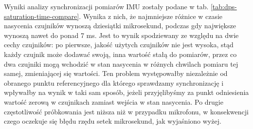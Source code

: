\documentclass[12pt,oneside,a4paper]{book}
\theoremstyle{break}
\begin{document}
\begin{table}[ht]
    \centering
        \caption{Zestawienie czasów wejścia czujników DPS w stan nasycenia}
        \label{tab:dps-saturation-time-compare}
\end{table}
 
Wyniki analizy synchronizacji pomiarów IMU zostały podane w tab. 
\ref*{tab:dps-saturation-time-compare}. Wynika z nich, że 
najmniejsze różnice w czasie nasycenia czujników wynoszą dziesiątki
mikrosekund, podczas gdy największe wynoszą nawet do ponad 7 ms.
Jest to wynik spodziewany ze względu na dwie cechy czujników:
po pierwsze, jakość użytych czujników nie jest wysoka, 
stąd każdy czujnik może dodawać swoją, inna wartość stałą do pomiarów, 
przez co dwa czujniki mogą wchodzić w stan nasycenia w różnych chwilach
pomiaru tej samej, zmieniającej się wartości. Ten problem występowałby
niezależnie od obranego punktu referencyjnego dla którego sprawdzamy 
synchronizację i wpływałby na wynik w taki sam sposób, jeżeli 
przyjęlibyśmy za punkt odniesienia wartość zerową w czujnikach zamiast
wejścia w stan nasycenia. Po drugie częstotliwość
próbkowania jest niższa niż w przypadku mikrofonu, w konsekwencji czego
oczekuje się błędu rzędu setek mikrosekund, jak wyjaśniono wyżej.
\end{document}
